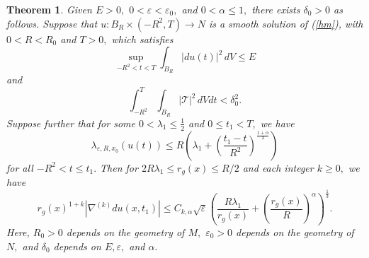 \documentclass[12pt]{amsart}
\newcommand{\LB}{\left[}
\newcommand{\RB}{\right]}
\newcommand{\T}{{\mathcal T}}
\newtheorem{thm}{Theorem}[section]
\theoremstyle{others}
\numberwithin{equation}{section}
\newcommand{\eps}{\varepsilon}
\begin{document}
\begin{thm}\label{thm:mainthm} %
Given $E > 0,$ $0 < \eps < \eps_0,$ and $0 < \alpha \leq 1,$ there exists $\delta_0 > 0$ as follows.  %
Suppose that $u : B_R \times \left( -R^2, T \right) \to N$ is a smooth solution of (\ref{hm}), with $0 < R < R_0$ and $T > 0,$ which satisfies
\begin{equation}\label{mainthm:energyassumption}
\sup_{-R^2<t<T} \int_{B_R} |du(t)|^2 \, dV \leq E
\end{equation}
and
\begin{equation}\label{mainthm:deltaassumption}
\int_{-R^2}^T \!\! \int_{B_R} |\T|^2 \, dV dt < \delta_0^2.
\end{equation}
Suppose further that for some $0 < \lambda_1 \leq \frac12$ and $0 \leq t_1 < T,$ we have
\begin{equation}\label{mainthm:lambdaassumption}
\lambda_{\eps, R, x_0}(u(t)) \leq R \left( \lambda_1 + \left( \frac{t_1 - t}{R^2} \right)^{\frac{1 + \alpha}{2}} \right)
\end{equation}
for all $-R^2 < t \leq t_1.$ %
Then for $2 R \lambda_1 \leq r_g(x) \leq R / 2$ and each integer $k \geq 0,$ we have
\begin{equation}\label{mainthm:est}
r_g(x)^{1 + k} |\nabla^{(k)} du (x,t_1)| \leq C_{k,\alpha} \sqrt{\eps} \left( \frac{R\lambda_1}{r_g(x)} + \left( \frac{r_g(x)}{R} \right)^\alpha \right)^{\frac13 }.
\end{equation}
Here, $R_0 > 0$ depends on the geometry of $M,$ $\eps_0 > 0$ depends on the geometry of $N,$ and $\delta_0$ depends on $E,\eps,$ and $\alpha.$ %
\end{thm}
\end{document}

